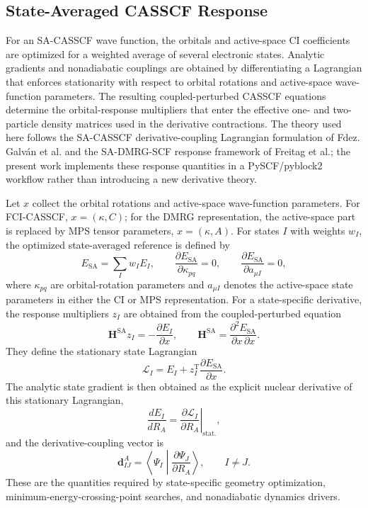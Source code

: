 \documentclass[journal=jctcce,manuscript=article]{achemso}
\begin{document}
\subsection{State-Averaged CASSCF Response}

For an SA-CASSCF wave function, the orbitals and active-space CI coefficients
are optimized for a weighted average of several electronic states.  Analytic
gradients and nonadiabatic couplings are obtained by differentiating a
Lagrangian that enforces stationarity with respect to orbital rotations and
active-space wave-function parameters.  The resulting coupled-perturbed
CASSCF equations determine the orbital-response multipliers that enter the
effective one- and two-particle density matrices used in the derivative
contractions.\cite{KnowlesWerner1985MCSCF,FdezGalvan2016,Freitag2019}
The theory used here follows the SA-CASSCF derivative-coupling Lagrangian
formulation of Fdez. Galv{\'a}n et al. and the SA-DMRG-SCF response framework
of Freitag et al.; the present work implements these response quantities in a
PySCF/pyblock2 workflow rather than introducing a new derivative theory.

Let $x$ collect the orbital rotations and active-space wave-function
parameters.  For FCI-CASSCF, $x=(\kappa,C)$; for the DMRG representation,
the active-space part is replaced by MPS tensor parameters, $x=(\kappa,A)$.
For states $I$ with weights $w_I$, the optimized state-averaged reference is
defined by
\begin{equation}
  E_{\mathrm{SA}} = \sum_I w_I E_I,
  \qquad
  \frac{\partial E_{\mathrm{SA}}}{\partial \kappa_{pq}} = 0,
  \qquad
  \frac{\partial E_{\mathrm{SA}}}{\partial a_{\mu I}} = 0 ,
\end{equation}
where $\kappa_{pq}$ are orbital-rotation parameters and $a_{\mu I}$ denotes
the active-space state parameters in either the CI or MPS representation.  For
a state-specific derivative, the response multipliers $z_I$ are obtained from
the coupled-perturbed equation
\begin{equation}
  \mathbf{H}^{\mathrm{SA}} z_I =
  -\frac{\partial E_I}{\partial x},
  \qquad
  \mathbf{H}^{\mathrm{SA}}
  =
  \frac{\partial^2 E_{\mathrm{SA}}}{\partial x\,\partial x}.
\end{equation}
They define the stationary state Lagrangian
\begin{equation}
  \mathcal{L}_I =
  E_I + z_I^{\mathrm{T}}
  \frac{\partial E_{\mathrm{SA}}}{\partial x}.
\end{equation}
The analytic state gradient is then obtained as the explicit nuclear
derivative of this stationary Lagrangian,
\begin{equation}
  \frac{dE_I}{dR_A} =
  \left.\frac{\partial \mathcal{L}_I}{\partial R_A}\right|_{\mathrm{stat.}},
\end{equation}
and the derivative-coupling vector is
\begin{equation}
  \mathbf{d}^{A}_{IJ} =
  \left\langle \Psi_I \middle| \frac{\partial \Psi_J}{\partial R_A}
  \right\rangle,\qquad I\ne J .
\end{equation}
These are the quantities required by state-specific geometry optimization,
minimum-energy-crossing-point searches, and nonadiabatic dynamics drivers.
\end{document}
